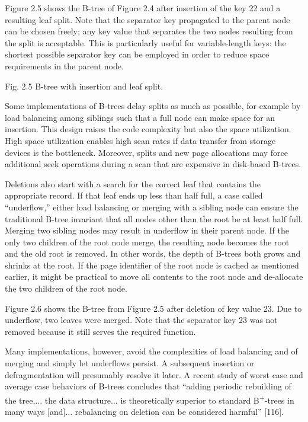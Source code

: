 Figure 2.5 shows the B-tree of Figure 2.4 after insertion of the key 22
and a resulting leaf split. Note that the separator key propagated to
the parent node can be chosen freely; any key value that separates the
two nodes resulting from the split is acceptable. This is particularly
useful for variable-length keys: the shortest possible separator key can
be employed in order to reduce space requirements in the parent node.

Fig. 2.5 B-tree with insertion and leaf split.

Some implementations of B-trees delay splits as much as possible, for
example by load balancing among siblings such that a full node can make
space for an insertion. This design raises the code complexity but also
the space utilization. High space utilization enables high scan rates if
data transfer from storage devices is the bottleneck. Moreover, splits
and new page allocations may force additional seek operations during a
scan that are expensive in disk-based B-trees.

Deletions also start with a search for the correct leaf that contains
the appropriate record. If that leaf ends up less than half full, a case
called ``underflow,'' either load balancing or merging with a sibling
node can ensure the traditional B-tree invariant that all nodes other
than the root be at least half full. Merging two sibling nodes may
result in underflow in their parent node. If the only two children of
the root node merge, the resulting node becomes the root and the old
root is removed. In other words, the depth of B-trees both grows and
shrinks at the root. If the page identifier of the root node is cached
as mentioned earlier, it might be practical to move all contents to the
root node and de-allocate the two children of the root node.

Figure 2.6 shows the B-tree from Figure 2.5 after deletion of key value
23. Due to underflow, two leaves were merged. Note that the separator
key 23 was not removed because it still serves the required function.

Many implementations, however, avoid the complexities of load balancing
and of merging and simply let underflows persist. A subsequent insertion
or defragmentation will presumably resolve it later. A recent study of
worst case and average case behaviors of B-trees concludes that ``adding
periodic rebuilding of the tree,... the data structure... is
theoretically superior to standard B\textsuperscript{+}-trees in many
ways {[}and{]}... rebalancing on deletion can be considered harmful''
{[}116{]}.

